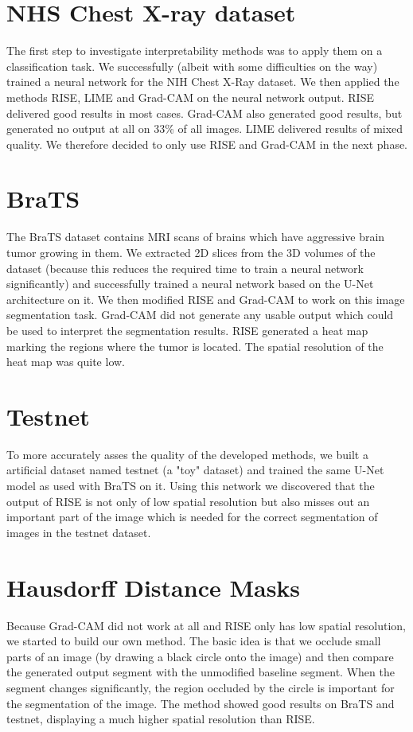 \section{NHS Chest X-ray dataset}
The first step to investigate interpretability methods was to apply them on a classification task.
We successfully (albeit with some difficulties on the way) trained a neural network for the NIH Chest X-Ray dataset.
We then applied the methods RISE, LIME and Grad-CAM on the neural network output. RISE delivered good results in most cases. Grad-CAM also generated good results, but generated no output at all on 33\% of all images. LIME delivered results of mixed quality. We therefore decided to only use RISE and Grad-CAM in the next phase.

\section{BraTS}
The BraTS dataset contains MRI scans of brains which have aggressive brain tumor growing in them. We extracted 2D slices from the 3D volumes of the dataset (because this reduces the required time to train a neural network significantly) and successfully trained a neural network based on the U-Net architecture on it. We then modified RISE and Grad-CAM to work on this image segmentation task. Grad-CAM did not generate any usable output which could be used to interpret the segmentation results. RISE generated a heat map marking the regions where the tumor is located. The spatial resolution of the heat map was quite low.

\section{Testnet}
To more accurately asses the quality of the developed methods, we built a artificial dataset named testnet (a "toy" dataset) and trained the same U-Net model as used with BraTS on it. Using this network we discovered that the output of RISE is not only of low spatial resolution but also misses out an important part of the image which is needed for the correct segmentation of images in the testnet dataset.

\section{Hausdorff Distance Masks}
Because Grad-CAM did not work at all and RISE only has low spatial resolution, we started to build our own method. 
The basic idea is that we occlude small parts of an image (by drawing a black circle onto the image) and then compare the generated output segment with the unmodified baseline segment. When the segment changes significantly, the region occluded by the circle is important for the segmentation of the image.
The method showed good results on BraTS and testnet, displaying a much higher spatial resolution than RISE.

